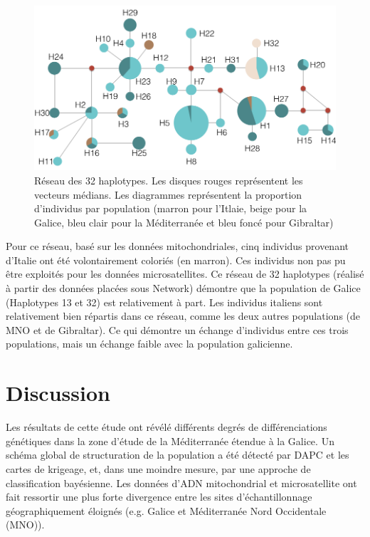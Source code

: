 \documentclass[a4paper,12pt,twoside]{article}\usepackage[]{graphicx}\usepackage[]{color}
\begin{document}
\begin {bibunit} [newbst]
\begin{figure}[h]
   \centering\includegraphics[scale=0.4]{reseau}
   \caption[Réseau d'haplotypes.]{Réseau des 32 haplotypes. Les disques rouges représentent les vecteurs médians. Les diagrammes représentent la proportion d'individus par population (marron pour l'Itlaie, beige pour la Galice, bleu clair pour la Méditerranée et bleu foncé pour Gibraltar)}
\end{figure}
\FloatBarrier

Pour ce réseau, basé sur les données mitochondriales, cinq individus provenant d'Italie ont été volontairement coloriés (en marron). Ces individus non pas pu être exploités pour les données microsatellites.
Ce réseau de 32 haplotypes (réalisé à partir des données placées sous Network) démontre que la population de Galice (Haplotypes 13 et 32) est relativement à part. Les individus italiens sont relativement bien répartis dans ce réseau, comme les deux autres populations (de MNO et de Gibraltar). Ce qui démontre un échange d'individus entre ces trois populations, mais un échange faible avec la population galicienne.

\section{Discussion} 

Les résultats de cette étude ont révélé différents degrés de différenciations génétiques dans la zone d'étude de la Méditerranée étendue à la Galice. Un schéma global de structuration de la population a été détecté par DAPC et les cartes de krigeage, et, dans une moindre mesure, par une approche de classification bayésienne. Les données d'ADN mitochondrial et microsatellite ont fait ressortir une plus forte divergence entre les sites d'échantillonnage géographiquement éloignés (e.g. Galice et Méditerranée Nord Occidentale (MNO)).


\end{bibunit}
\end{document}
